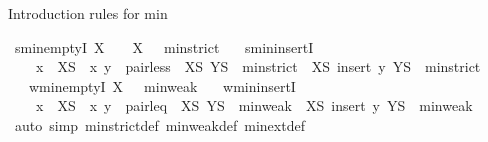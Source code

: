 \begin{isabellebody}
\endisatagproof
{\isafoldproof}%
%
\isadelimproof
%
\endisadelimproof
%
\begin{isamarkuptext}%
Introduction rules for min%
\end{isamarkuptext}\isamarkuptrue%
\isamarkupfalse%
\ smin{\isacharunderscore}{\kern0pt}emptyI{\isacharcolon}{\kern0pt}\ {\isachardoublequoteopen}X\ {\isasymnoteq}\ {\isacharbraceleft}{\kern0pt}{\isacharbraceright}{\kern0pt}\ {\isasymLongrightarrow}\ {\isacharparenleft}{\kern0pt}X{\isacharcomma}{\kern0pt}\ {\isacharbraceleft}{\kern0pt}{\isacharbraceright}{\kern0pt}{\isacharparenright}{\kern0pt}\ {\isasymin}\ min{\isacharunderscore}{\kern0pt}strict{\isachardoublequoteclose}\isanewline
\ \ \ smin{\isacharunderscore}{\kern0pt}insertI{\isacharcolon}{\kern0pt}\isanewline
\ \ \ \ {\isachardoublequoteopen}x\ {\isasymin}\ XS\ {\isasymLongrightarrow}\ {\isacharparenleft}{\kern0pt}x{\isacharcomma}{\kern0pt}\ y{\isacharparenright}{\kern0pt}\ {\isasymin}\ pair{\isacharunderscore}{\kern0pt}less\ {\isasymLongrightarrow}\ {\isacharparenleft}{\kern0pt}XS{\isacharcomma}{\kern0pt}\ YS{\isacharparenright}{\kern0pt}\ {\isasymin}\ min{\isacharunderscore}{\kern0pt}strict\ {\isasymLongrightarrow}\ {\isacharparenleft}{\kern0pt}XS{\isacharcomma}{\kern0pt}\ insert\ y\ YS{\isacharparenright}{\kern0pt}\ {\isasymin}\ min{\isacharunderscore}{\kern0pt}strict{\isachardoublequoteclose}\isanewline
\ \ \ wmin{\isacharunderscore}{\kern0pt}emptyI{\isacharcolon}{\kern0pt}\ {\isachardoublequoteopen}{\isacharparenleft}{\kern0pt}X{\isacharcomma}{\kern0pt}\ {\isacharbraceleft}{\kern0pt}{\isacharbraceright}{\kern0pt}{\isacharparenright}{\kern0pt}\ {\isasymin}\ min{\isacharunderscore}{\kern0pt}weak{\isachardoublequoteclose}\isanewline
\ \ \ wmin{\isacharunderscore}{\kern0pt}insertI{\isacharcolon}{\kern0pt}\isanewline
\ \ \ \ {\isachardoublequoteopen}x\ {\isasymin}\ XS\ {\isasymLongrightarrow}\ {\isacharparenleft}{\kern0pt}x{\isacharcomma}{\kern0pt}\ y{\isacharparenright}{\kern0pt}\ {\isasymin}\ pair{\isacharunderscore}{\kern0pt}leq\ {\isasymLongrightarrow}\ {\isacharparenleft}{\kern0pt}XS{\isacharcomma}{\kern0pt}\ YS{\isacharparenright}{\kern0pt}\ {\isasymin}\ min{\isacharunderscore}{\kern0pt}weak\ {\isasymLongrightarrow}\ {\isacharparenleft}{\kern0pt}XS{\isacharcomma}{\kern0pt}\ insert\ y\ YS{\isacharparenright}{\kern0pt}\ {\isasymin}\ min{\isacharunderscore}{\kern0pt}weak{\isachardoublequoteclose}\isanewline
%
\isadelimproof
\ \ %
\endisadelimproof
%
\isatagproof
{}\isamarkupfalse%
\ {\isacharparenleft}{\kern0pt}auto\ simp{\isacharcolon}{\kern0pt}\ min{\isacharunderscore}{\kern0pt}strict{\isacharunderscore}{\kern0pt}def\ min{\isacharunderscore}{\kern0pt}weak{\isacharunderscore}{\kern0pt}def\ min{\isacharunderscore}{\kern0pt}ext{\isacharunderscore}{\kern0pt}def{\isacharparenright}{\kern0pt}%

\end{isabellebody}

